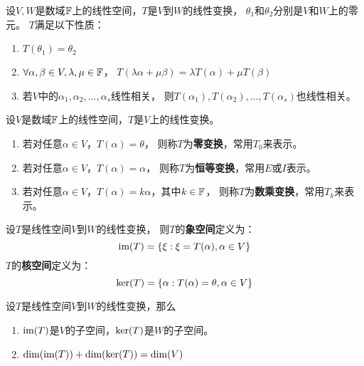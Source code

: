 \begin{theorem}[线性变换的性质]
  设$V,W$是数域$\mathbb{F}$上的线性空间，$T$是$V$到$W$的线性变换，
  $\theta_1$和$\theta_2$分别是$V$和$W$上的零元。
  $T$满足以下性质：
  \begin{enumerate}
    \item
    $T(\theta_1) = \theta_2$
    \item
    $\forall\alpha,\beta\in V,\lambda,\mu\in\mathbb{F}$，
    $T(\lambda\alpha+\mu\beta)=\lambda T(\alpha)+\mu T(\beta)$
    \item
    若$V$中的$\alpha_1,\alpha_2,\dots,\alpha_s$线性相关，
    则$T(\alpha_1),T(\alpha_2),\dots,T(\alpha_s)$也线性相关。
  \end{enumerate}
\end{theorem}

\begin{definition}[特殊的线性变换]
  设$V$是数域$\mathbb{F}$上的线性空间，$T$是$V$上的线性变换。
  \begin{enumerate}
    \item
    若对任意$\alpha\in V$，$T(\alpha)=\theta$，
    则称$T$为\textbf{零变换}，常用$T_0$来表示。
    \item
    若对任意$\alpha\in V$，$T(\alpha)=\alpha$，
    则称$T$为\textbf{恒等变换}，常用$E$或$I$表示。
    \item
    若对任意$\alpha\in V$，$T(\alpha)=k\alpha$，其中$k\in\mathbb{F}$，
    则称$T$为\textbf{数乘变换}，常用$T_k$来表示。
  \end{enumerate}
\end{definition}

\begin{definition}[象空间与核空间]
  设$T$是线性空间$V$到$W$的线性变换，
  则$T$的\textbf{象空间}定义为：
  \[ \textrm{im}(T) = \{ \xi: \xi=T(\alpha), \alpha\in V\} \]
  $T$的\textbf{核空间}定义为：
  \[ \textrm{ker}(T) = \{ \alpha: T(\alpha)=\theta, \alpha\in V \} \]
\end{definition}

\begin{theorem}[象空间与核空间的性质]
  设$T$是线性空间$V$到$W$的线性变换，那么
  \begin{enumerate}
    \item
    $\textrm{im}(T)$是$V$的子空间，$\textrm{ker}(T)$是$W$的子空间。
    \item
    $\textrm{dim}(\textrm{im}(T)) + \textrm{dim}(\ker(T)) = \dim(V)$
  \end{enumerate}
\end{theorem}

